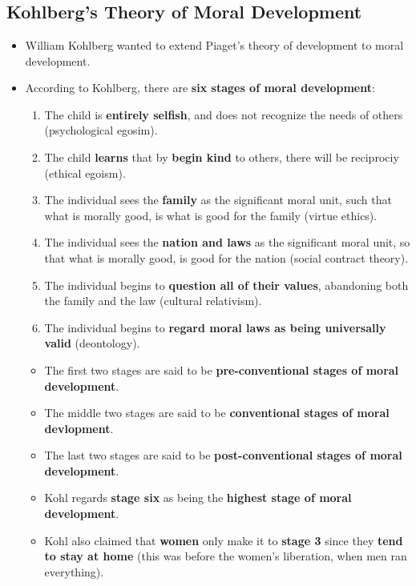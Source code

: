 \documentclass[16pt]{article}
\begin{document}
    \section*{}

    \subsection*{Kohlberg's Theory of Moral Development}
    \begin{itemize}
        \item William Kohlberg wanted to extend Piaget's theory of development to moral development.
        \item According to Kohlberg, there are \textbf{six stages of moral development}:
        \begin{enumerate}
            \item The child is \textbf{entirely selfish}, and does not recognize the needs of others (psychological egosim).
            \item The child \textbf{learns} that by \textbf{begin kind} to others, there will be reciprociy (ethical egoism).
            \item The individual sees the \textbf{family} as the significant moral unit, such that what is morally good, is what is good for the family (virtue ethics).
            \item The individual sees the \textbf{nation and laws} as the significant moral unit, so that what is morally good, is good for the nation (social contract theory).
            \item The individual begins to \textbf{question all of their values}, abandoning both the family and the law (cultural relativism).
            \item The individual begins to \textbf{regard moral laws as being universally valid} (deontology). 
        \end{enumerate}
        \begin{itemize}
            \item The first two stages are said to be \textbf{pre-conventional stages of moral development}.
            \item The middle two stages are said to be \textbf{conventional stages of moral devlopment}.
            \item The last two stages are said to be \textbf{post-conventional stages of moral development}.
            \item Kohl regards \textbf{stage six} as being the \textbf{highest stage of moral development}.
            \item Kohl also claimed that \textbf{women} only make it to \textbf{stage 3} since they \textbf{tend to stay at home} (this was before the women's liberation, when men ran everything).
        \end{itemize}
    \end{itemize}
\end{document}
